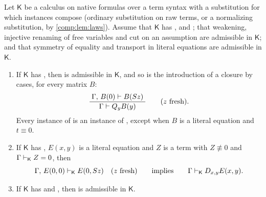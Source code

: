 \begin{lemma}
\label{comp:lem:single}
Let $\mathsf{K}$ be a calculus on native formulas over a term syntax with a
substitution for which instances compose (ordinary substitution on raw
terms, or a normalizing substitution, by \cref{comp:lem:laws}). Assume that
$\mathsf{K}$ has ,  and ; that
weakening, injective renaming of free variables and cut on an assumption are
admissible in $\mathsf{K}$; and that symmetry of equality and transport in
literal equations are admissible in $\mathsf{K}$.
\begin{enumerate}[label=(\roman*)]
\item If $\mathsf{K}$ has , then  is admissible in
 $\mathsf{K}$, and so is the introduction of a closure by cases, for every
 matrix $B$:
 \[
  \dfrac{\;\Gamma,\,B(0)\vdash B(S z)\;}{\;\Gamma\vdash Q_{y}B(y)\;}
  \qquad(z\text{ fresh}).
 \]
 Every instance of  is an instance of , except
 when $B$ is a literal equation and $t\equiv0$.
\item If $\mathsf{K}$ has , $E(x,y)$ is a literal equation and
 $Z$ is a term with $Z\not\equiv0$ and $\Gamma\vdash_{\mathsf K}Z=0$, then
 \[
  \Gamma,\,E(0,0)\vdash_{\mathsf K}E(0,S z)\quad(z\text{ fresh})
  \qquad\text{implies}\qquad
  \Gamma\vdash_{\mathsf K}D_{x,y}E(x,y).
 \]
\item If $\mathsf{K}$ has  and , then
  is admissible in $\mathsf{K}$.
\end{enumerate}
\end{lemma}

